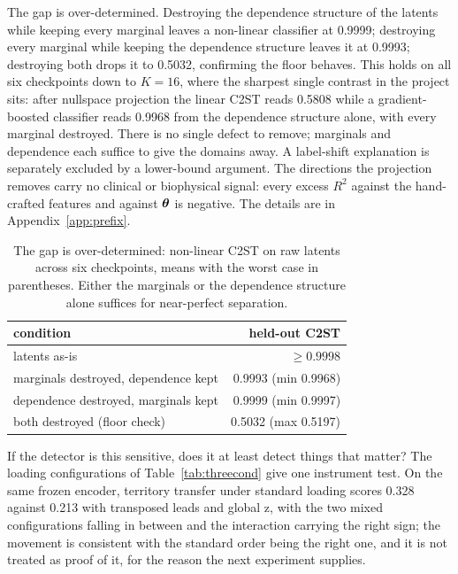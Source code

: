 The gap is over-determined. Destroying the dependence structure of the latents while keeping every marginal leaves a non-linear classifier at 0.9999; destroying every marginal while keeping the dependence structure leaves it at 0.9993; destroying both drops it to 0.5032, confirming the floor behaves. This holds on all six checkpoints down to $K=16$, where the sharpest single contrast in the project sits: after nullspace projection the linear C2ST reads 0.5808 while a gradient-boosted classifier reads 0.9968 from the dependence structure alone, with every marginal destroyed. There is no single defect to remove; marginals and dependence each suffice to give the domains away. A label-shift explanation is separately excluded by a lower-bound argument. The directions the projection removes carry no clinical or biophysical signal: every excess $R^2$ against the hand-crafted features and against $\boldsymbol{\theta}$ is negative. The details are in Appendix~\ref{app:prefix}. 

\begin{table}[tb]
\centering\small
\caption{The gap is over-determined: non-linear C2ST on raw latents across six checkpoints, means with the worst case in parentheses. Either the marginals or the dependence structure alone suffices for near-perfect separation.}
\label{tab:overdet}
\begin{tabular}{lr}
\toprule
condition & held-out C2ST \\
\midrule
latents as-is & $\geq 0.9998$ \\
marginals destroyed, dependence kept & 0.9993 (min 0.9968) \\
dependence destroyed, marginals kept & 0.9999 (min 0.9997) \\
both destroyed (floor check) & 0.5032 (max 0.5197) \\
\bottomrule
\end{tabular}
\end{table}

If the detector is this sensitive, does it at least detect things that matter? The loading configurations of Table~\ref{tab:threecond} give one instrument test. On the same frozen encoder, territory transfer under standard loading scores 0.328 against 0.213 with transposed leads and global z, with the two mixed configurations falling in between and the interaction carrying the right sign; the movement is consistent with the standard order being the right one, and it is not treated as proof of it, for the reason the next experiment supplies. 

